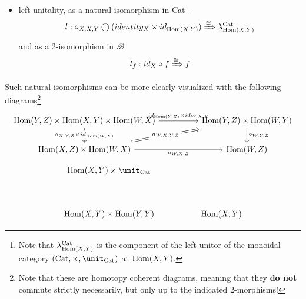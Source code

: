 \begin{defn}[Bicategory]
\begin{itemize}
\begin{itemize}
            and as a 2-isomorphism in $\bat$
            $$r_f:f\circ id_Y\xRightarrow{\cong} f$$
            \item left unitality, as a natural isomorphism in Cat\footnote{Note that $\lambda^{\operatorname{Cat}}_{\operatorname{Hom}(X,Y)}$ is the component of the left unitor of the monoidal category $(\Cat,\times,\unit_{\Cat})$ at $\operatorname{Hom}(X,Y)$.}  $$l:\circ_{X,X,Y}\bigcirc(identity_X\times id_{\operatorname{Hom}(X,Y)})\xRightarrow{\cong}\lambda^{\operatorname{Cat}}_{\operatorname{Hom}(X,Y)}$$
            and as a 2-isomorphism in $\bat$
            $$l_f:id_X\circ f\xRightarrow{\cong} f$$
        \end{itemize}
        
        Such natural isomorphisms can be more clearly visualized with the following diagrams\footnote{Note that these are homotopy coherent diagrams, meaning that they \textbf{do not} commute strictly necessarily, but only up to the indicated 2-morphisms!}
\[\begin{tikzcd}
    {\Hom(Y,Z)\times \Hom(X,Y)\times \Hom(W,X)} && {\Hom(Y,Z)\times \Hom(W,Y)} \\
    {\Hom(X,Z)\times \Hom(W,X)} && {\Hom(W,Z)}
    \arrow["{\circ_{X,Y,Z}\times id_{\Hom(W,X)}}"{description}, from=1-1, to=2-1]
    \arrow["{\circ_{W,X,Z}}"', from=2-1, to=2-3]
    \arrow["{id_{\Hom(Y,Z)}\times id_{W,X,Y}}", from=1-1, to=1-3]
    \arrow["{\circ_{W,Y,Z}}", from=1-3, to=2-3]
    \arrow["{a_{W,X,Y,Z}}"{description}, shorten <=8pt, shorten >=8pt, Rightarrow, from=2-1, to=1-3]
\end{tikzcd}\]
\[\begin{tikzcd}
    {\Hom(X,Y)\times \unit_{\Cat}} \\
    \\
    {\Hom(X,Y)\times \Hom(Y,Y)} && {\Hom(X,Y)}

\end{tikzcd}\]
\end{itemize}
\end{defn}
